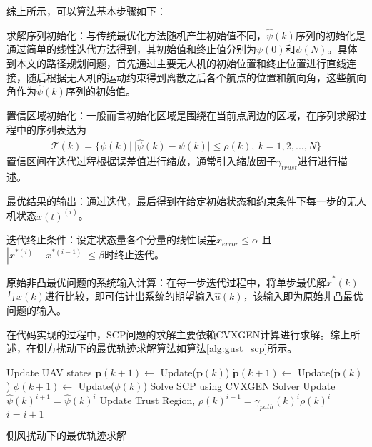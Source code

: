 综上所示，可以算法基本步骤如下：
\begin{compactenum}
	\item 求解序列初始化：与传统最优化方法随机产生初始值不同，$\hat{\psi}(k)$序列的初始化是通过简单的线性迭代方法得到，其初始值和终止值分别为$\psi(0)$和$\psi(N)$。具体到本文的路径规划问题，首先通过主要无人机的初始位置和终止位置进行直线连接，随后根据无人机的运动约束得到离散之后各个航点的位置和航向角，这些航向角作为$\hat{\psi}(k)$序列的初始值。
	\item 置信区域初始化：一般而言初始化区域是围绕在当前点周边的区域，在序列求解过程中的序列表达为
	\begin{align}
	\mathcal{T}(k) = \{\psi(k)|\ |\hat{\psi}(k)-{\psi}(k)| \le \rho(k),\ k=1,2,...,N \}
	\end{align}
	置信区间在迭代过程根据误差值进行缩放，通常引入缩放因子$\gamma_{trust}$进行进行描述。
	
	\item 最优结果的输出：通过迭代，最后得到在给定初始状态和约束条件下每一步的无人机状态$\hat{x}(t)^{(i)}$。
	
	\item 迭代终止条件：设定状态量各个分量的线性误差$x_{error} \le \alpha$ 且$|x^{*(i)} - x^{*(i-1)} | \le \beta$时终止迭代。
	
	\item 原始非凸最优问题的系统输入计算：在每一步迭代过程中，将单步最优解$\hat{x}^{*}(k)$与$x(k)$进行比较，即可估计出系统的期望输入$\hat{u}(k)$，该输入即为原始非凸最优问题的输入。
\end{compactenum}
在代码实现的过程中，SCP问题的求解主要依赖CVXGEN\cite{mattingley2012cvxgen}计算进行求解。综上所述，在侧方扰动下的最优轨迹求解算法如算法\ref{alg:gust_scp}所示。

\begin{algorithm2e}
	\SetAlgoLined
	
	{
		Update UAV states \;
		$\mathbf{p}(k+1) \leftarrow$ Update($\mathbf{p}(k)$)\;
		$\dot{\mathbf{p}}(k+1) \leftarrow$ Update($\dot{\mathbf{p}}(k)$)\;
		${\phi}(k+1) \leftarrow$ Update(${\phi}(k)$)\;
		Solve SCP using CVXGEN Solver\;
		Update $\hat{\psi}(k)^{i+1} = \hat{\psi}(k)^{i} $\;
		Update Trust Region, $\rho(k)^{i+1} = \gamma_{path}(k)^{i} \rho(k)^{i}$ \;
		$i = i + 1$
	}
	\caption{侧风扰动下的最优轨迹求解}
	\label{alg:gust_scp}
\end{algorithm2e}

